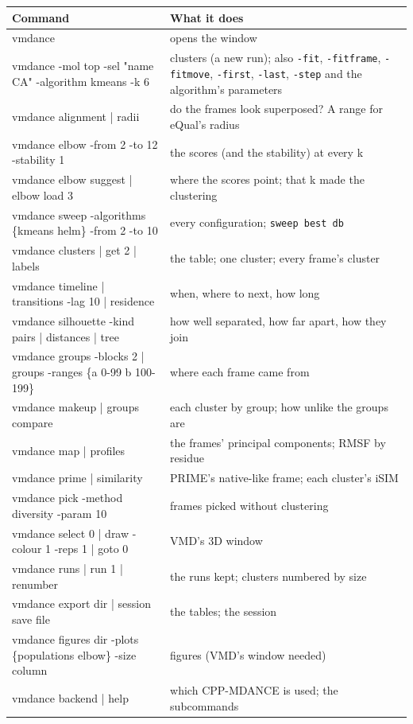 \documentclass[11pt,letterpaper]{article}
\newcommand{\cmd}[1]{\texttt{#1}}
\begin{document}
\begin{center}
\small
\begin{tabularx}{\textwidth}{@{}T{0.52\textwidth}L@{}}
\toprule
\normalfont\textbf{Command} & \textbf{What it does} \\
\midrule
vmdance & opens the window \\
vmdance -mol top -sel "name CA" -algorithm kmeans -k 6 & clusters (a new run); also \cmd{-fit}, \cmd{-fitframe}, \cmd{-fitmove}, \cmd{-first}, \cmd{-last}, \cmd{-step} and the algorithm's parameters \\
vmdance alignment | radii & do the frames look superposed? A range for eQual's radius \\
vmdance elbow -from 2 -to 12 -stability 1 & the scores (and the stability) at every k \\
vmdance elbow suggest | elbow load 3 & where the scores point; that k made the clustering \\
vmdance sweep -algorithms \{kmeans helm\} -from 2 -to 10 & every configuration; \cmd{sweep best db} \\
vmdance clusters | get 2 | labels & the table; one cluster; every frame's cluster \\
vmdance timeline | transitions -lag 10 | residence & when, where to next, how long \\
vmdance silhouette -kind pairs | distances | tree & how well separated, how far apart, how they join \\
vmdance groups -blocks 2 | groups -ranges \{a 0-99 b 100-199\} & where each frame came from \\
vmdance makeup | groups compare & each cluster by group; how unlike the groups are \\
vmdance map | profiles & the frames' principal components; RMSF by residue \\
vmdance prime | similarity & PRIME's native-like frame; each cluster's iSIM \\
vmdance pick -method diversity -param 10 & frames picked without clustering \\
vmdance select 0 | draw -colour 1 -reps 1 | goto 0 & VMD's 3D window \\
vmdance runs | run 1 | renumber & the runs kept; clusters numbered by size \\
vmdance export dir | session save file & the tables; the session \\
vmdance figures dir -plots \{populations elbow\} -size column & figures (VMD's window needed) \\
vmdance backend | help & which CPP-MDANCE is used; the subcommands \\
\bottomrule
\end{tabularx}
\end{center}
\end{document}
